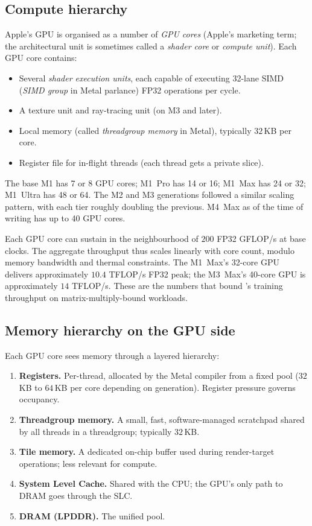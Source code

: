 \subsection{Compute hierarchy}
\label{ssec:apple_silicon:gpu_compute}

Apple's GPU is organised as a number of \emph{GPU cores} (Apple's
marketing term; the architectural unit is sometimes called a
\emph{shader core} or \emph{compute unit}). Each GPU core contains:
\begin{itemize}
  \item Several \emph{shader execution units}, each capable of
    executing 32-lane SIMD (\emph{SIMD group} in Metal parlance) FP32
    operations per cycle.
  \item A texture unit and ray-tracing unit (on M3 and later).
  \item Local memory (called \emph{threadgroup memory} in Metal),
    typically $32$\,KB per core.
  \item Register file for in-flight threads (each thread gets a
    private slice).
\end{itemize}

The base M1 has 7 or 8 GPU cores; M1~Pro has 14 or 16; M1~Max has
24 or 32; M1~Ultra has 48 or 64. The M2 and M3 generations followed
a similar scaling pattern, with each tier roughly doubling the
previous. M4~Max as of the time of writing has up to 40 GPU cores.

Each GPU core can sustain in the neighbourhood of $200$ FP32 GFLOP/s
at base clocks. The aggregate throughput thus scales linearly with
core count, modulo memory bandwidth and thermal constraints. The
M1~Max's 32-core GPU delivers approximately $10.4$ TFLOP/s FP32
peak; the M3~Max's 40-core GPU is approximately $14$ TFLOP/s. These
are the numbers that bound \Lucid's training throughput on
matrix-multiply-bound workloads.

\subsection{Memory hierarchy on the GPU side}
\label{ssec:apple_silicon:gpu_mem}

Each GPU core sees memory through a layered hierarchy:
\begin{enumerate}
  \item \textbf{Registers.} Per-thread, allocated by the Metal
    compiler from a fixed pool ($32$\,KB to $64$\,KB per core
    depending on generation). Register pressure governs occupancy.
  \item \textbf{Threadgroup memory.} A small, fast, software-managed
    scratchpad shared by all threads in a threadgroup; typically
    $32$\,KB.
  \item \textbf{Tile memory.} A dedicated on-chip buffer used during
    render-target operations; less relevant for compute.
  \item \textbf{System Level Cache.} Shared with the CPU; the GPU's
    only path to DRAM goes through the SLC.
  \item \textbf{DRAM (LPDDR).} The unified pool.
\end{enumerate}

